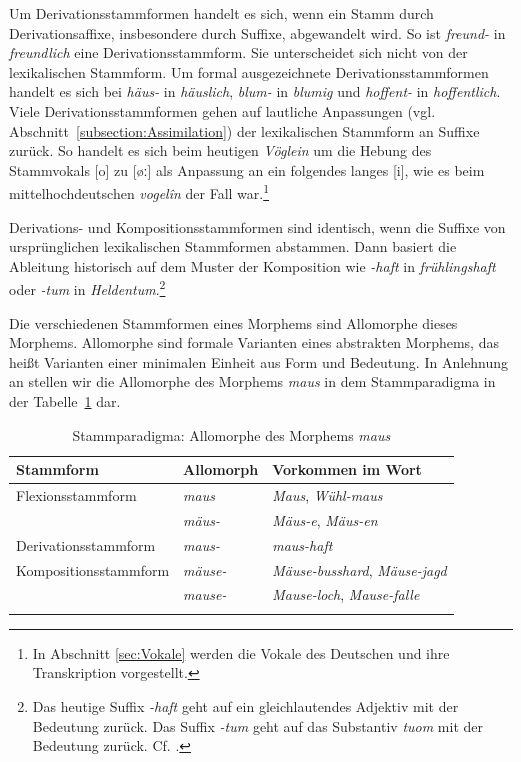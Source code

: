 Um Derivationsstammformen handelt es sich, wenn ein Stamm durch Derivationsaffixe, insbesondere durch Suffixe, abgewandelt wird. So ist \textit{freund-} in \textit{freundlich} eine Derivationsstammform. Sie unterscheidet sich nicht von der lexikalischen Stammform. Um formal ausgezeichnete Derivationsstammformen handelt es sich bei \textit{häus-} in \textit{häuslich}, \textit{blum-} in \textit{blumig} und \textit{hoffent-} in \textit{hoffentlich}. Viele Derivationsstammformen gehen auf lautliche Anpassungen (vgl. Abschnitt~\ref{subsection:Assimilation}) der lexikalischen Stammform an Suffixe zurück. So handelt es sich beim heutigen \textit{Vöglein} um die Hebung des Stammvokals [o] zu [{øː}] als Anpassung an ein folgendes langes [i], wie es beim mittelhochdeutschen  \textit{vogelîn} der Fall war.\footnote{In Abschnitt \ref{sec:Vokale} werden die Vokale des Deutschen und ihre Transkription vorgestellt.}

Derivations- und Kompositionsstammformen sind identisch, wenn die Suffixe von ursprünglichen lexikalischen Stammformen abstammen. Dann basiert die Ableitung historisch auf dem Muster der Komposition wie \textit{-haft} in \textit{frühlingshaft} oder \textit{-tum} in \textit{Heldentum}.\footnote{Das heutige Suffix \textit{-haft} geht auf ein gleichlautendes Adjektiv mit der Bedeutung  zurück. Das Suffix \textit{-tum} geht auf das Substantiv \textit{tuom} mit der Bedeutung  zurück. Cf. \citet[390, 500]{Wilmanns1896Wb}.}


Die verschiedenen Stammformen eines Morphems sind Allomorphe dieses Morphems. Allomorphe sind formale Varianten eines abstrakten Morphems, das heißt Varianten einer minimalen Einheit aus Form und Bedeutung. In Anlehnung an \citet[22--33]{Fuhrhop1998} stellen wir die Allomorphe des Morphems \textit{maus} in dem Stammparadigma in der Tabelle~\ref{tab:Stammparadigma} dar. 


\begin{table}[!htbp]
  \centering
  \begin{tabular}{l l l}
    \lsptoprule
    Stammform & Allomorph & Vorkommen im Wort \\
    \hline
    Flexionsstammform & \textit{maus}  & \textit{Maus}, \textit{Wühl-maus} \\
    & \textit{mäus-} & \textit{Mäus-e}, \textit{Mäus-en} \\
    
    Derivationsstammform & \textit{maus-}  & \textit{maus-haft} \\
    
    Kompositionsstammform & \textit{mäuse-} & \textit{Mäuse-busshard}, \textit{Mäuse-jagd} \\
    & \textit{mause-} & \textit{Mause-loch}, \textit{Mause-falle} \\
    \lspbottomrule 
  \end{tabular}
  \caption{Stammparadigma: Allomorphe des Morphems \textit{maus}}
  \label{tab:Stammparadigma}
\end{table}


